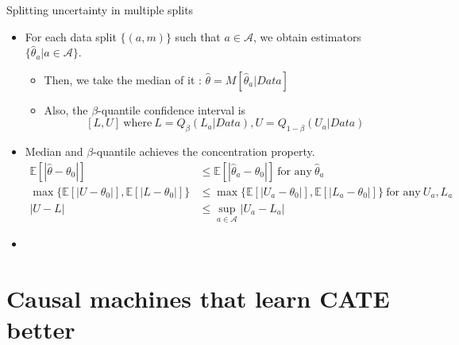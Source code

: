 \documentclass[xcolor=svgnames,aspectratio=169]{beamer}
\newcommand{\E}{\mathbb{E}}
\begin{document}
\begin{frame}{Splitting uncertainty in multiple splits}
    \begin{itemize}
        \item For each data split $\{(a,m)\}$ such that $a\in \mathcal{A} $, we obtain estimators $\{\hat{\theta}_a|a\in\mathcal{A} \}$.
        \begin{itemize}
            \item Then, we take the median of it : $\hat{\theta}=M[\hat{\theta}_a|Data]$
            \item Also, the $\beta$-quantile confidence interval is 
            \[
            [L,U] \  \text{where} \ L=Q_{\beta}(L_a|Data), U=Q_{1-\beta}(U_a|Data)
            \]
        \end{itemize}
        \item Median and $\beta$-quantile achieves the \alert{concentration} property.
        \begin{align*}
            \E[|\hat{\theta}-\theta_0|]&\leq \E[|\hat{\theta}_a-\theta_0|] \ \text{for any} \ \hat{\theta}_a \\
            \max\{\E[|U-\theta_0|], \E[|L-\theta_0|]\}&\leq \max\{\E[|U_a-\theta_0|], \E[|L_a-\theta_0|]\} \ \text{for any} \ U_a, L_a \\
            |U-L|&\leq \sup_{a\in\mathcal{A} }|U_a-L_a|
        \end{align*}
        \item 
    \end{itemize}
\end{frame}

\section{Causal machines that learn CATE better}
\end{document}
